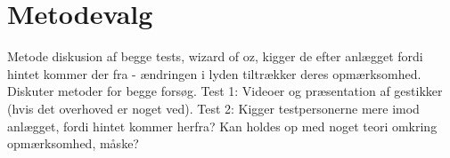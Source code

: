 \section{Metodevalg}
\label{DiskussionMetodevalg}
%
Metode diskusion af begge tests, wizard of oz, kigger de efter anlægget fordi hintet kommer der fra - ændringen i lyden tiltrækker deres opmærksomhed. 
Diskuter metoder for begge forsøg. Test 1: Videoer og præsentation af gestikker (hvis det overhoved er noget ved). Test 2: Kigger testpersonerne mere imod anlægget, fordi hintet kommer herfra? Kan holdes op med noget teori omkring opmærksomhed, måske?